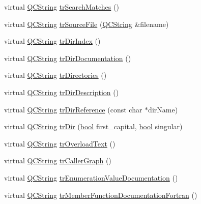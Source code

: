 \begin{DoxyCompactItemize}
virtual \hyperlink{class_q_c_string}{Q\+C\+String} \hyperlink{class_translator_macedonian_aeeaa6c6415e05d93610e34e102715977}{tr\+Search\+Matches} ()
\item 
virtual \hyperlink{class_q_c_string}{Q\+C\+String} \hyperlink{class_translator_macedonian_a8ddb69c60f68ba801c7b1846e1241e26}{tr\+Source\+File} (\hyperlink{class_q_c_string}{Q\+C\+String} \&filename)
\item 
virtual \hyperlink{class_q_c_string}{Q\+C\+String} \hyperlink{class_translator_macedonian_aa478e1d6f79c12010b298633241baf91}{tr\+Dir\+Index} ()
\item 
virtual \hyperlink{class_q_c_string}{Q\+C\+String} \hyperlink{class_translator_macedonian_a77e2f657f5b10b6a92984cd48976c9ed}{tr\+Dir\+Documentation} ()
\item 
virtual \hyperlink{class_q_c_string}{Q\+C\+String} \hyperlink{class_translator_macedonian_adea140dc8193a22ebb270d26d332af19}{tr\+Directories} ()
\item 
virtual \hyperlink{class_q_c_string}{Q\+C\+String} \hyperlink{class_translator_macedonian_a305dc44e06fdf716dbe46c369b5a82fc}{tr\+Dir\+Description} ()
\item 
virtual \hyperlink{class_q_c_string}{Q\+C\+String} \hyperlink{class_translator_macedonian_af49ee3467b439e5773824153d8d18c75}{tr\+Dir\+Reference} (const char $\ast$dir\+Name)
\item 
virtual \hyperlink{class_q_c_string}{Q\+C\+String} \hyperlink{class_translator_macedonian_afbffb3f70b05f35bbdf9b3095c46c4a2}{tr\+Dir} (\hyperlink{qglobal_8h_a1062901a7428fdd9c7f180f5e01ea056}{bool} first\+\_\+capital, \hyperlink{qglobal_8h_a1062901a7428fdd9c7f180f5e01ea056}{bool} singular)
\item 
virtual \hyperlink{class_q_c_string}{Q\+C\+String} \hyperlink{class_translator_macedonian_a325b33ea816553dda7e4db9a7e6dee2b}{tr\+Overload\+Text} ()
\item 
virtual \hyperlink{class_q_c_string}{Q\+C\+String} \hyperlink{class_translator_macedonian_ae6ec7166ec1b58d7e9374e85f6b314c8}{tr\+Caller\+Graph} ()
\item 
virtual \hyperlink{class_q_c_string}{Q\+C\+String} \hyperlink{class_translator_macedonian_a196e4698019efb3bdd935f13a6f5b1cb}{tr\+Enumeration\+Value\+Documentation} ()
\item 
virtual \hyperlink{class_q_c_string}{Q\+C\+String} \hyperlink{class_translator_macedonian_a1409a1d2fe6e580a1ccd6f950bfa2652}{tr\+Member\+Function\+Documentation\+Fortran} ()
\item 

\end{DoxyCompactItemize}
